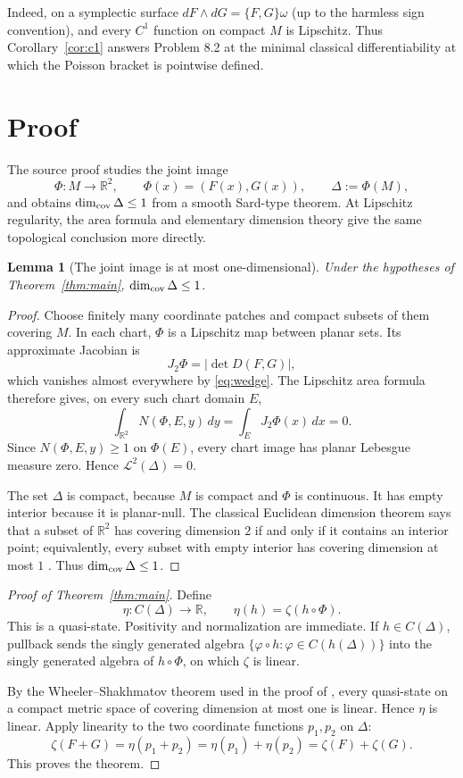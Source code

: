 \documentclass[11pt]{article}
\newtheorem{lemma}[theorem]{Lemma}
\newcommand{\R}{\mathbb R}
\newcommand{\cL}{\mathcal L}
\begin{document}
Indeed, on a symplectic surface
$dF\wedge dG=\{F,G\}\omega$ (up to the harmless sign convention), and every
$C^1$ function on compact $M$ is Lipschitz.  Thus Corollary~\ref{cor:c1}
answers Problem 8.2 at the minimal classical differentiability at which the
Poisson bracket is pointwise defined.

\section{Proof}

The source proof studies the joint image
\[
 \Phi:M\longrightarrow\R^2,\qquad \Phi(x)=(F(x),G(x)),
 \qquad \Delta:=\Phi(M),
\]
and obtains $\dim_{\rm cov}\Delta\leq1$ from a smooth Sard-type theorem.
At Lipschitz regularity, the area formula and elementary dimension theory
give the same topological conclusion more directly.

\begin{lemma}[The joint image is at most one-dimensional]
Under the hypotheses of Theorem~\ref{thm:main},
$\dim_{\rm cov}\Delta\leq1$.
\end{lemma}

\begin{proof}
Choose finitely many coordinate patches and compact subsets of them covering
$M$.  In each chart, $\Phi$ is a Lipschitz map between planar sets.  Its
approximate Jacobian is
\[
 J_2\Phi=\bigl|\det D(F,G)\bigr|,
\]
which vanishes almost everywhere by \eqref{eq:wedge}.  The Lipschitz area
formula therefore gives, on every such chart domain $E$,
\[
 \int_{\R^2}N(\Phi,E,y)\,dy
   =\int_E J_2\Phi(x)\,dx=0.
\]
Since $N(\Phi,E,y)\geq1$ on $\Phi(E)$, every chart image has planar
Lebesgue measure zero.  Hence $\cL^2(\Delta)=0$.

The set $\Delta$ is compact, because $M$ is compact and $\Phi$ is continuous.
It has empty interior because it is planar-null.  The classical Euclidean
dimension theorem says that a subset of $\R^2$ has covering dimension $2$
if and only if it contains an interior point; equivalently, every subset
with empty interior has covering dimension at most $1$
\cite[Theorem 1.8.10]{Engelking}.  Thus $\dim_{\rm cov}\Delta\leq1$.
\end{proof}

\begin{proof}[Proof of Theorem~\ref{thm:main}]
Define
\[
 \eta:C(\Delta)\longrightarrow\R,
 \qquad \eta(h)=\zeta(h\circ\Phi).
\]
This is a quasi-state.  Positivity and normalization are immediate.  If
$h\in C(\Delta)$, pullback sends the singly generated algebra
$\{\varphi\circ h:\varphi\in C(h(\Delta))\}$ into the singly generated
algebra of $h\circ\Phi$, on which $\zeta$ is linear.

By the Wheeler--Shakhmatov theorem used in the proof of
\cite[Theorem 8.1]{EP}, every quasi-state on a compact metric space of
covering dimension at most one is linear.  Hence $\eta$ is linear.  Apply
linearity to the two coordinate functions $p_1,p_2$ on $\Delta$:
\[
 \zeta(F+G)
 =\eta(p_1+p_2)
 =\eta(p_1)+\eta(p_2)
 =\zeta(F)+\zeta(G).
\]
This proves the theorem.
\end{proof}
\end{document}
